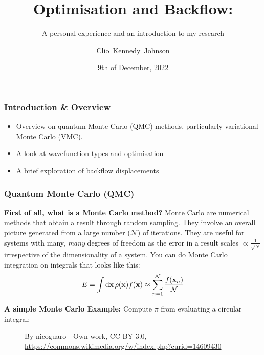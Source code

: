 \documentclass[10pt]{beamer}
\title[Wavefunction Optimisation and Backflow in Quantum Monte Carlo Simulations]{Optimisation and Backflow:}
\subtitle{A personal experience and an introduction to my research}
\author[Clio Johnson]{Clio~Kennedy~Johnson}
\date[2022-12-09]{9th of December, 2022}
\begin{document}
\begin{frame}
    \titlepage
\end{frame}


\begin{frame}
    \frametitle{Introduction \& Overview}
    \begin{itemize}
        \item[\textbullet] Overview on quantum Monte Carlo (QMC) methods, particularly variational Monte Carlo (VMC).
        \item[\textbullet] A look at wavefunction types and optimisation
        \item[\textbullet] A brief exploration of backflow displacements
    \end{itemize}
\end{frame}


\begin{frame}[allowframebreaks]
    \frametitle{Quantum Monte Carlo (QMC)}
    \textbf{First of all, what is a Monte Carlo method?}\medskip\newline
    Monte Carlo are numerical methods that obtain a result through random sampling. They involve an overall picture generated from a large number ($\mathcal{N}$) of iterations.\medskip\newline
    They are useful for systems with many, \textit{many} degrees of freedom as the error in a result scales $\propto\frac{1}{\sqrt{N}}$ irrespective of the dimensionality of a system.\medskip\newline %
    You can do Monte Carlo integration on integrals that looks like this:
    \begin{equation}
        E = \int\dd{\vb{x}}\rho\pqty{\vb{x}}f\pqty{\vb{x}}
        \approx\sum_{n=1}^{\mathcal{N}}\frac{f\pqty{\vb{x}_n}}{\mathcal{N}}
    \end{equation}
    \framebreak

    \textbf{A simple Monte Carlo Example:}\medskip\newline
    Compute $\pi$ from evaluating a circular integral:
    \begin{figure}
        \centering
        \caption{
            By nicoguaro - Own work, CC BY 3.0,
            \url{https://commons.wikimedia.org/w/index.php?curid=14609430}
        }
    \end{figure}
    \framebreak


\end{frame}
\end{document}
